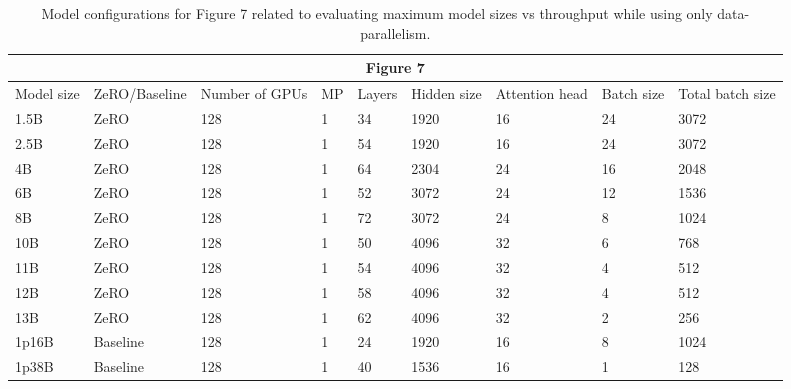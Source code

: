 \documentclass{article}
\begin{document}
\begin{table}[]
\scriptsize
\begin{tabular}{|l|l|l|l|l|l|l|l|l|}    
\hline
\multicolumn{9}{|c|}{Figure 7} \\ \hline
Model size & ZeRO/Baseline & Number of GPUs & MP & Layers & Hidden size & Attention head & Batch size & Total batch size \\ \hline
1.5B & ZeRO & 128 & 1 & 34 & 1920 & 16 & 24 & 3072 \\ \hline
2.5B & ZeRO & 128 & 1 & 54 & 1920 & 16 & 24 & 3072 \\ \hline
4B & ZeRO & 128 & 1 & 64 & 2304 & 24 & 16 & 2048 \\ \hline
6B & ZeRO & 128 & 1 & 52 & 3072 & 24 & 12 & 1536 \\ \hline
8B & ZeRO & 128 & 1 & 72 & 3072 & 24 & 8 & 1024 \\ \hline
10B & ZeRO & 128 & 1 & 50 & 4096 & 32 & 6 & 768 \\ \hline
11B & ZeRO & 128 & 1 & 54 & 4096 & 32 & 4 & 512 \\ \hline
12B & ZeRO & 128 & 1 & 58 & 4096 & 32 & 4 & 512 \\ \hline
13B & ZeRO & 128 & 1 & 62 & 4096 & 32 & 2 & 256 \\ \hline
1p16B & Baseline & 128 & 1 & 24 & 1920 & 16 & 8 & 1024 \\ \hline
1p38B & Baseline & 128 & 1 & 40 & 1536 & 16 & 1 & 128 \\ \hline
\end{tabular}
\caption{Model configurations for Figure 7 related to evaluating maximum model sizes vs throughput while using only data-parallelism.} \label{tab:fig7-tab}
\end{table}
\end{document}
